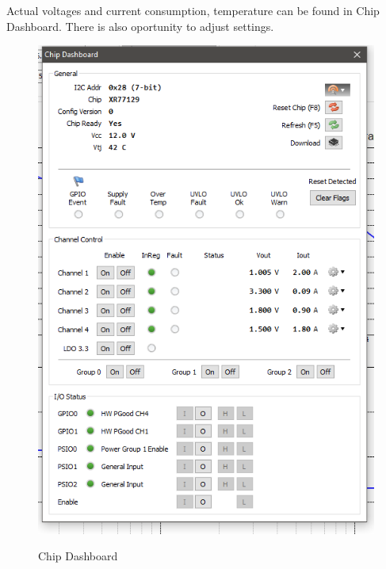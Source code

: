 Actual voltages and current consumption, temperature can be found in Chip Dashboard. There is also oportunity to adjust settings.

	\begin{figure}[htbp!]
		\centering
		\includegraphics[scale=0.6]{img/exarprog.png}\\
		\caption{Chip Dashboard} 
	\end{figure}


